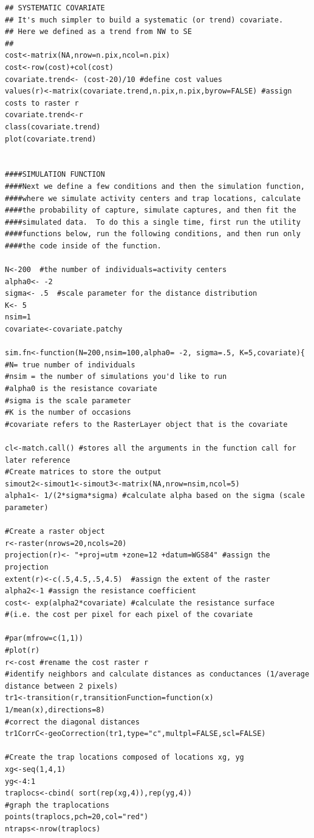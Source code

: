 \documentclass[12pt]{article}
\begin{document}
\begin{spacing}{1.2}
{\begin{verbatim}
## SYSTEMATIC COVARIATE
## It's much simpler to build a systematic (or trend) covariate.
## Here we defined as a trend from NW to SE
## 
cost<-matrix(NA,nrow=n.pix,ncol=n.pix)
cost<-row(cost)+col(cost)
covariate.trend<- (cost-20)/10 #define cost values
values(r)<-matrix(covariate.trend,n.pix,n.pix,byrow=FALSE) #assign costs to raster r
covariate.trend<-r
class(covariate.trend)
plot(covariate.trend)


####SIMULATION FUNCTION
####Next we define a few conditions and then the simulation function, 
####where we simulate activity centers and trap locations, calculate
####the probability of capture, simulate captures, and then fit the 
####simulated data.  To do this a single time, first run the utility
####functions below, run the following conditions, and then run only 
####the code inside of the function.

N<-200  #the number of individuals=activity centers
alpha0<- -2  
sigma<- .5  #scale parameter for the distance distribution
K<- 5
nsim=1
covariate<-covariate.patchy

sim.fn<-function(N=200,nsim=100,alpha0= -2, sigma=.5, K=5,covariate){
#N= true number of individuals
#nsim = the number of simulations you'd like to run
#alpha0 is the resistance covariate
#sigma is the scale parameter
#K is the number of occasions
#covariate refers to the RasterLayer object that is the covariate

cl<-match.call() #stores all the arguments in the function call for later reference
#Create matrices to store the output
simout2<-simout1<-simout3<-matrix(NA,nrow=nsim,ncol=5)
alpha1<- 1/(2*sigma*sigma) #calculate alpha based on the sigma (scale parameter)

#Create a raster object
r<-raster(nrows=20,ncols=20)
projection(r)<- "+proj=utm +zone=12 +datum=WGS84" #assign the projection
extent(r)<-c(.5,4.5,.5,4.5)  #assign the extent of the raster
alpha2<-1 #assign the resistance coefficient
cost<- exp(alpha2*covariate) #calculate the resistance surface 
#(i.e. the cost per pixel for each pixel of the covariate

#par(mfrow=c(1,1))
#plot(r)
r<-cost #rename the cost raster r
#identify neighbors and calculate distances as conductances (1/average distance between 2 pixels)
tr1<-transition(r,transitionFunction=function(x) 1/mean(x),directions=8)
#correct the diagonal distances 
tr1CorrC<-geoCorrection(tr1,type="c",multpl=FALSE,scl=FALSE) 

#Create the trap locations composed of locations xg, yg
xg<-seq(1,4,1)
yg<-4:1
traplocs<-cbind( sort(rep(xg,4)),rep(yg,4))
#graph the traplocations
points(traplocs,pch=20,col="red")
ntraps<-nrow(traplocs)



\end{verbatim}}
\end{spacing}
\end{document}
